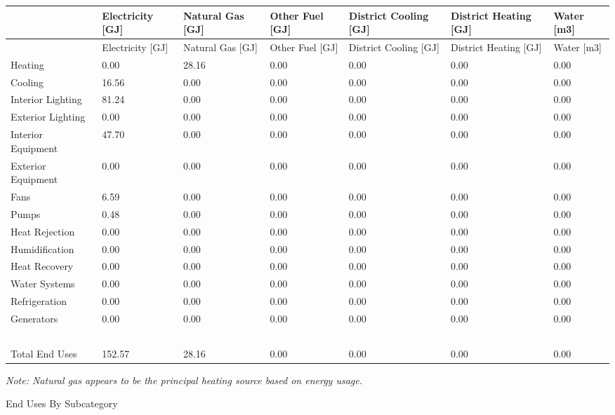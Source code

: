 \begin{longtable}[c]{p{0.85in}p{0.85in}p{0.85in}p{0.85in}p{0.85in}p{0.85in}p{0.85in}}
\toprule 
~ & Electricity [GJ] & Natural Gas [GJ] & Other Fuel [GJ] & District Cooling [GJ] & District Heating [GJ] & Water [m3] \tabularnewline
\midrule
\endfirsthead

\toprule 
~ & Electricity [GJ] & Natural Gas [GJ] & Other Fuel [GJ] & District Cooling [GJ] & District Heating [GJ] & Water [m3] \tabularnewline
\midrule
\endhead

Heating & 0.00 & 28.16 & 0.00 & 0.00 & 0.00 & 0.00 \tabularnewline
Cooling & 16.56 & 0.00 & 0.00 & 0.00 & 0.00 & 0.00 \tabularnewline
Interior Lighting & 81.24 & 0.00 & 0.00 & 0.00 & 0.00 & 0.00 \tabularnewline
Exterior Lighting & 0.00 & 0.00 & 0.00 & 0.00 & 0.00 & 0.00 \tabularnewline
Interior Equipment & 47.70 & 0.00 & 0.00 & 0.00 & 0.00 & 0.00 \tabularnewline
Exterior Equipment & 0.00 & 0.00 & 0.00 & 0.00 & 0.00 & 0.00 \tabularnewline
Fans & 6.59 & 0.00 & 0.00 & 0.00 & 0.00 & 0.00 \tabularnewline
Pumps & 0.48 & 0.00 & 0.00 & 0.00 & 0.00 & 0.00 \tabularnewline
Heat Rejection & 0.00 & 0.00 & 0.00 & 0.00 & 0.00 & 0.00 \tabularnewline
Humidification & 0.00 & 0.00 & 0.00 & 0.00 & 0.00 & 0.00 \tabularnewline
Heat Recovery & 0.00 & 0.00 & 0.00 & 0.00 & 0.00 & 0.00 \tabularnewline
Water Systems & 0.00 & 0.00 & 0.00 & 0.00 & 0.00 & 0.00 \tabularnewline
Refrigeration & 0.00 & 0.00 & 0.00 & 0.00 & 0.00 & 0.00 \tabularnewline
Generators & 0.00 & 0.00 & 0.00 & 0.00 & 0.00 & 0.00 \tabularnewline
~ & ~ & ~ & ~ & ~ & ~ & ~ \tabularnewline
Total End Uses & 152.57 & 28.16 & 0.00 & 0.00 & 0.00 & 0.00 \tabularnewline
\bottomrule
\end{longtable}

\emph{Note: Natural gas appears to be the principal heating source based on energy usage.}

End Uses By Subcategory

